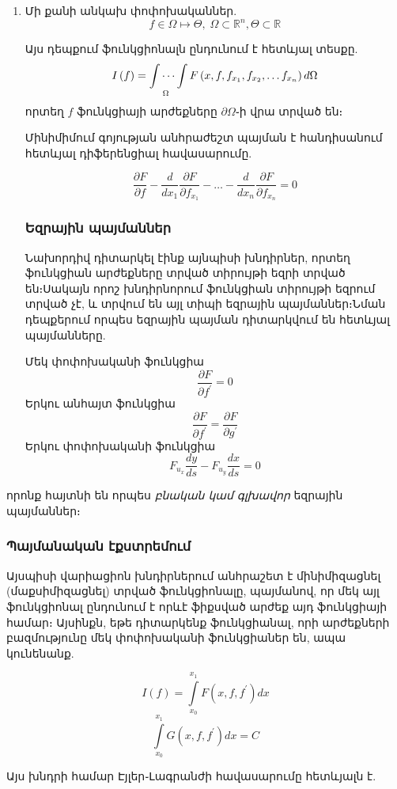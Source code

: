 \documentclass[fleqn, bachelor,subf,12pt,notitlepage]{article}
\begin{document}
\begin{enumerate}
\item Մի քանի անկախ փոփոխականներ.
$$f \in \Omega \mapsto \Theta, \; \Omega \subset \mathbb{R}^{n}, \Theta \subset \mathbb{R}$$

\noindent Այս դեպքում ֆունկցիոնալն ընդունում է հետևյալ տեսքը.
$$I\left(f\right) = \idotsint \limits_{\Omega} F\left(x, f, f_{x_{1}}, f_{x_{2}}, \dots f_{x_{n} }\right)d\Omega$$
\noindent որտեղ $f$ ֆունկցիայի արժեքները $\partial \Omega$֊ի վրա տրված են։

\noindent Մինիմիմում գոյության անհրաժեշտ պայման է հանդիսանում հետևյալ դիֆերենցիալ հավասարումը.

$$\dfrac{\partial F}{\partial f} - \dfrac{d}{dx_{1}}\dfrac{\partial F}{\partial f_{x_{1}}} - \dots -\dfrac{d}{dx_{n}}\dfrac{\partial F}{\partial f_{x_{n}}}=0$$

\newpage
\subsubsection*{Եզրային պայմաններ}
Նախորդիվ դիտարկել էինք այնպիսի խնդիրներ, որտեղ ֆունկցիան արժեքները տրված տիրույթի եզրի տրված են։Սակայն որոշ խնդիրնորում ֆունկցիան տիրույթի եզրում տրված չէ, և տրվում են այլ տիպի եզրային պայմաններ։Նման դեպքերում որպես եզրային պայման դիտարկվում են հետևյալ պայմանները.

Մեկ փոփոխականի ֆունկցիա
$$\dfrac{\partial F}{\partial f^{'}}=0$$
Երկու անհայտ ֆունկցիա
$$\dfrac{\partial F}{\partial f^{'}}=\dfrac{\partial F}{\partial g^{'}}$$
Երկու փոփոխականի ֆունկցիա
$$F_{u_{x}}\dfrac{dy}{ds}-F_{u_{y}}\dfrac{dx}{ds}=0$$
\end{enumerate}

\noindent որոնք հայտնի են որպես \emph{բնական կամ գլխավոր}  եզրային պայմաններ։

\subsubsection*{Պայմանական էքստրեմում}
Այսպիսի վարիացիոն խնդիրներում անհրաշետ է մինիմիզացնել (մաքսիմիզացնել) տրված ֆունկցիոնալը, պայմանով, որ մեկ այլ ֆունկցիոնալ ընդունում է որևէ ֆիքսված արժեք այդ ֆունկցիայի համար։ Այսինքն, եթե դիտարկենք ֆունկցիանալ, որի արժեքների բազմությունը մեկ փոփոխականի ֆունկցիաներ են, ապա կունենանք.

$$I\left(f\right)=\int \limits_{x_{0}}^{x_{1}} F\left(x, f, f^{'}\right)dx $$
$$\int \limits_{x_{0}}^{x_{1}} G\left(x, f, f^{'}\right)dx = C$$

Այս խնդրի համար Էյլեր֊Լագրանժի հավասարումը հետևյալն է.
\end{document}
